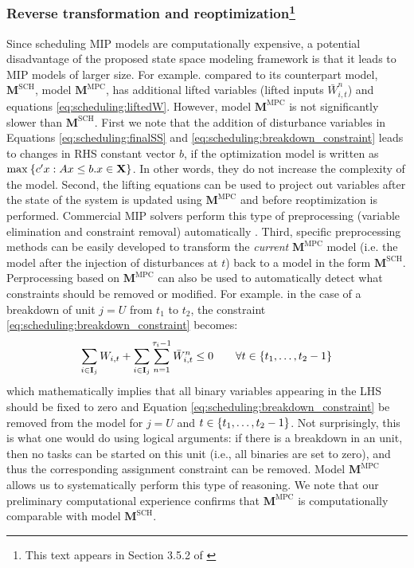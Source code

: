 \subsubsection{Reverse transformation and reoptimization\footnote{This text appears in Section 3.5.2 of \citet{subramanian:maravelias:rawlings:2012}}}

Since scheduling MIP models are computationally expensive, a potential
disadvantage of the proposed state space modeling framework is that it
leads to MIP models of larger size. For example. compared to its
counterpart model, $\mathbf{M}^{\text{SCH}}$, model
$\mathbf{M}^{\text{MPC}}$, has additional lifted variables (lifted
inputs $\bar{W}_{i,t}^{n}$) and
equations \eqref{eq:scheduling:liftedW}. However, model $\mathbf{M}^{\text{MPC}}$
is not significantly slower than $\mathbf{M}^{\text{SCH}}$. First we
note that the addition of disturbance variables in Equations
\eqref{eq:scheduling:finalSS} and
\eqref{eq:scheduling:breakdown_constraint} leads to changes in RHS
constant vector $b$, if the optimization model is written as
$\max_{}{\left\lbrace c'x: Ax \leq b. x \in \mathbf{X} \right\rbrace}$. In other words,
they do not increase the complexity of the model. Second, the lifting
equations can be used to project out variables after the state of the
system is updated using $\mathbf{M}^{\text{MPC}}$ and before
reoptimization is performed. Commercial MIP solvers perform this type
of preprocessing (variable elimination and constraint removal) automatically
\citep{atamturk:savelsbergh:2005}. Third, specific preprocessing
methods can be easily developed to transform the {\emph{current}}
$\mathbf{M}^{\text{MPC}}$ model (i.e. the model after the injection of
disturbances at $t$) back to a model in the form
$\mathbf{M}^{\text{SCH}}$. Perprocessing based on
$\mathbf{M}^{\text{MPC}}$ can also be used to automatically detect
what constraints should be removed or modified. For example. in the
case of a breakdown of unit $j=U$ from $t_1$ to $t_2$, the constraint
\eqref{eq:scheduling:breakdown_constraint} becomes:
\[ \sum_{i\in \mathbf{I}_j}W_{i,t} + \sum_{i \in
  \mathbf{I}_j}\sum_{n=1}^{\tau_i-1} \bar{W}_{i,t}^{n} \leq 0 \qquad
\forall t \in \left\lbrace t_1,\ldots,t_2-1 \right\rbrace
\] 
which mathematically implies that all binary variables appearing in
the LHS should be fixed to zero and Equation
\eqref{eq:scheduling:breakdown_constraint} be removed from the model
for $j=U$ and $t\in \left\lbrace t_1,\ldots,t_2-1 \right\rbrace$. Not surprisingly, this is
what one would do using logical arguments: if there is a breakdown in
an unit, then no tasks can be started on this unit (i.e., all binaries
are set to zero), and thus the corresponding assignment constraint can
be removed. Model $\mathbf{M}^{\text{MPC}}$ allows us to
systematically perform this type of reasoning. We note that our
preliminary computational experience confirms that
$\mathbf{M}^{\text{MPC}}$ is computationally comparable with model
$\mathbf{M}^{\text{SCH}}$. 



